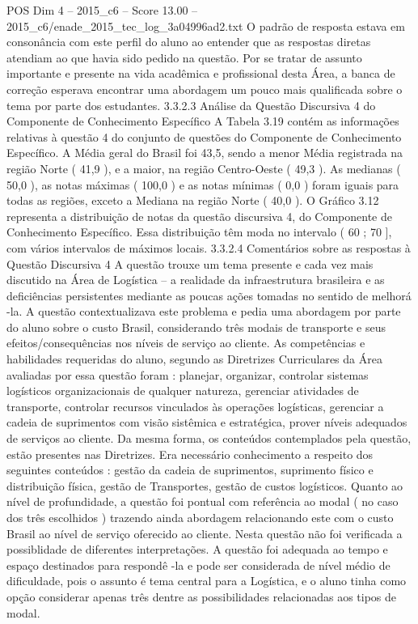 \begin{textsample}{POS Dim 4 – 2015\_c6 – Score 13.00 – 2015\_c6/enade\_2015\_tec\_log\_3a04996ad2.txt}
O padrão de resposta estava em consonância com este perfil do aluno ao entender que as respostas diretas atendiam ao que havia sido pedido na questão.
Por se tratar de assunto importante e presente na vida acadêmica e profissional desta Área, a banca de correção esperava encontrar uma abordagem um pouco mais qualificada sobre o tema por parte dos estudantes. 3.3.2.3 Análise da Questão Discursiva 4 do Componente de Conhecimento Específico A Tabela 3.19 contém as informações relativas à questão 4 do conjunto de questões do Componente de Conhecimento Específico.
A Média geral do Brasil foi 43,5, sendo a menor Média registrada na região Norte ( 41,9 ), e a maior, na região Centro-Oeste ( 49,3 ).
As medianas ( 50,0 ), as notas máximas ( 100,0 ) e as notas mínimas ( 0,0 ) foram iguais para todas as regiões, exceto a Mediana na região Norte ( 40,0 ).
O Gráfico 3.12 representa a distribuição de notas da questão discursiva 4, do Componente de Conhecimento Específico.
Essa distribuição têm moda no intervalo ( 60 ; 70 ], com vários intervalos de máximos locais. 3.3.2.4 Comentários sobre as respostas à Questão Discursiva 4 A questão trouxe um tema presente e cada vez mais discutido na Área de Logística – a realidade da infraestrutura brasileira e as deficiências persistentes mediante as poucas ações tomadas no sentido de melhorá -la.
A questão contextualizava este problema e pedia uma abordagem por parte do aluno sobre o custo Brasil, considerando três modais de transporte e seus efeitos/consequências nos níveis de serviço ao cliente.
As competências e habilidades requeridas do aluno, segundo as Diretrizes Curriculares da Área avaliadas por essa questão foram : planejar, organizar, controlar sistemas logísticos organizacionais de qualquer natureza, gerenciar atividades de transporte, controlar recursos vinculados às operações logísticas, gerenciar a cadeia de suprimentos com visão sistêmica e estratégica, prover níveis adequados de serviços ao cliente.
Da mesma forma, os conteúdos contemplados pela questão, estão presentes nas Diretrizes.
Era necessário conhecimento a respeito dos seguintes conteúdos : gestão da cadeia de suprimentos, suprimento físico e distribuição física, gestão de Transportes, gestão de custos logísticos.
Quanto ao nível de profundidade, a questão foi pontual com referência ao modal ( no caso dos três escolhidos ) trazendo ainda abordagem relacionando este com o custo Brasil ao nível de serviço oferecido ao cliente.
Nesta questão não foi verificada a possiblidade de diferentes interpretações.
A questão foi adequada ao tempo e espaço destinados para respondê -la e pode ser considerada de nível médio de dificuldade, pois o assunto é tema central para a Logística, e o aluno tinha como opção considerar apenas três dentre as possibilidades relacionadas aos tipos de modal.

\end{textsample}
